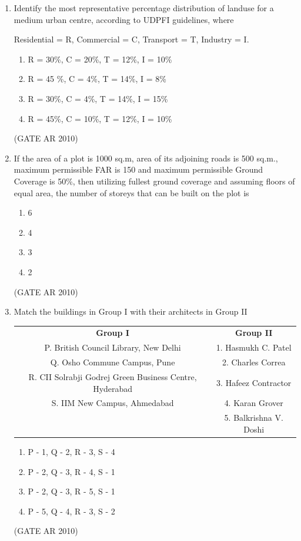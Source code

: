 \documentclass[journal]{IEEEtran}
\begin{document}
\begin{enumerate}
\item Identify the most representative percentage distribution of landuse for a medium urban centre, according to UDPFI guidelines, where

Residential = R, Commercial = C, Transport = T, Industry = I.
\begin{enumerate}
\item R = 30\%, C = 20\%, T = 12\%, I = 10\%
\item R = 45 \%, C = 4\%, T = 14\%, I = 8\%
\item R = 30\%, C = 4\%, T = 14\%, I = 15\%
\item R = 45\%, C = 10\%, T = 12\%, I = 10\%
\end{enumerate}
\hfill (GATE AR 2010)

\item If the area of a plot is 1000 sq.m, area of its adjoining roads is 500 sq.m., maximum permissible FAR is 150 and maximum permissible Ground Coverage is 50\%, then utilizing fullest ground coverage and assuming floors of equal area, the number of storeys that can be built on the plot is
\begin{multicols}{4}
\begin{enumerate}
\item 6
\item 4
\item 3
\item 2
\end{enumerate}
\end{multicols}
\hfill (GATE AR 2010)

\item Match the buildings in Group I with their architects in Group II

\begin{table}[H]
\centering
\begin{tabular}{cc}
\textbf{Group I} & \textbf{Group II} \\
P. British Council Library, New Delhi & 1. Hasmukh C. Patel \\
Q. Osho Commune Campus, Pune & 2. Charles Correa \\
R. CII Solrabji Godrej Green Business Centre, Hyderabad & 3. Hafeez Contractor \\
S. IIM New Campus, Ahmedabad & 4. Karan Grover \\
& 5. Balkrishna V. Doshi \\
\end{tabular}
\end{table}

\begin{multicols}{2}
\begin{enumerate}
\item P - 1, Q - 2, R - 3, S - 4
\item P - 2, Q - 3, R - 4, S - 1
\item P - 2, Q - 3, R - 5, S - 1
\item P - 5, Q - 4, R - 3, S - 2
\end{enumerate}
\end{multicols}
\hfill (GATE AR 2010)


\end{enumerate}
\end{document}
